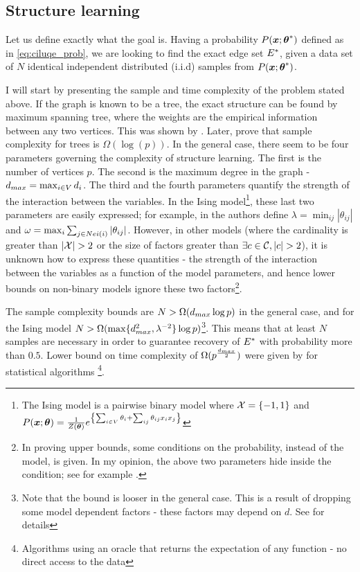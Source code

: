 \subsection{Structure learning}
Let us define exactly what the goal is.
Having a probability $P(\boldsymbol{x};{\boldsymbol{\theta}}^{*})$ defined as in \eqref{eq:ciluqe_prob},
we are looking to find the exact edge set ${E}^{*}$, given a data set of $N$ identical independent distributed (i.i.d) samples from $P(\boldsymbol{x};{\boldsymbol{\theta}}^{*})$.

I will start by presenting the sample and time complexity of the problem stated above. 
If the graph is known to be a tree, the exact structure can be found by maximum spanning tree, where the weights are the empirical information between any two vertices. This was shown by \cite{chowLiu}. 
Later, \cite{tan2011learning} prove that sample complexity for trees is $\Omega(\log(p))$.
In the general case, there seem to be four parameters governing the complexity of structure learning.
The first is the number of vertices $p$.
The second is the maximum degree in the graph - $d_{max} = \max_{i \in V} d_i$.
The third and the fourth parameters quantify the strength of the interaction between the variables.
In the Ising model\footnote{ The Ising model is a pairwise binary model where ${\cal X} = \{-1,1\}$ and $P(\boldsymbol{x};\boldsymbol{\theta}) = \frac{1}{Z(\boldsymbol{\theta})} e^{\left\{\sum_{i \in V}\theta_i + \sum_{ij}\theta_{ij}x_ix_j\right\}}$}, these last two parameters are easily expressed; for example, in \cite{santhanam2012information} the authors define $\lambda = \min_{ij} |\theta_{ij}|$ and $\omega = \max_i \sum_{j \in Nei(i)} |\theta_{ij}|$.
However, in other models (where the cardinality is greater than $|\cX|>2$ or the size of factors greater than $\exists c \in \cC, |c|>2$), it is unknown how to express these quantities - the strength of the interaction between the variables as a function of the model parameters, and hence lower bounds on non-binary models ignore these two factors\footnote{In proving upper bounds, some conditions on the probability, instead of the model, is given. In my opinion, the above two parameters hide inside the condition; see for example \cite{bresler2008reconstruction}.}.

The sample complexity bounds are $N > \Omega(d_{max} \log p)$ in the general case, and for the Ising model $N > \Omega(\max\{d_{max}^2, \lambda^{-2}\}\log p)$\footnote{Note that the bound is looser in the general case. This is a result of dropping some model dependent factors - these factors may depend on $d$. See \cite{bresler2008reconstruction} for details}.
This means that at least $N$ samples are necessary in order to guarantee recovery of ${E}^{*}$ with probability more than $0.5$.
Lower bound on time complexity of $\Omega(p^{\frac{d_{max}}{2}})$ were given by \cite{bresler2014structure} for statistical algorithms \cite{feldman2013statistical}\footnote{Algorithms using an oracle that returns the expectation of any function - no direct access to the data}.

